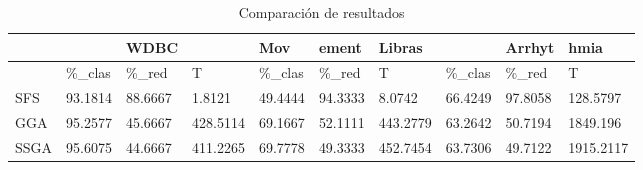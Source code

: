 \begin{table}[H]
	\centering
	\small
	\begin{tabular}{l|lll|lll|lll}
				& 			& WDBC 		&			&	  Mov	& ement 	& Libras	&			& Arrhyt	& hmia		\\ \hline
				& \%\_clas	& \%\_red	& T			& \%\_clas	& \%\_red	& T			& \%\_clas	& \%\_red	& T			\\ \hline
		SFS		& 93.1814	& 88.6667	& 1.8121	& 49.4444	& 94.3333	& 8.0742	& 66.4249	& 97.8058	& 128.5797	\\ \hline
		GGA		& 95.2577	& 45.6667	& 428.5114	& 69.1667	& 52.1111	& 443.2779	& 63.2642	& 50.7194	& 1849.196	\\ \hline
		SSGA	& 95.6075	& 44.6667	& 411.2265	& 69.7778	& 49.3333	& 452.7454	& 63.7306	& 49.7122	& 1915.2117
		
	\end{tabular}
	\caption{Comparación de resultados}
	\label{Compare}
\end{table}